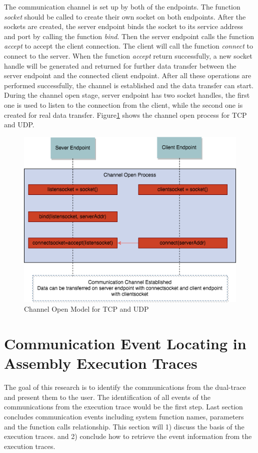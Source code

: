 The communication channel is set up by both of the endpoints. The function \textit{socket} should be called to create their own socket on both endpoints. After the sockets are created, the server endpoint binds the socket to its service address and port by calling the function \textit{bind}. Then the server endpoint calls the function  \textit{accept} to accept the client connection. The client will call the function \textit{connect} to connect to the server. When the function \textit{accept} return successfully, a new socket handle will be generated and returned for further data transfer between the server endpoint and  the connected client endpoint. After all these operations are performed successfully, the channel is established and the data transfer can start. During the channel open stage, server endpoint has two socket handles, the first one is used to listen to the connection from the client, while the second one is created for real data transfer. Figure\ref{channelopen2} shows the channel open process for TCP and UDP.
    
\begin{figure}[H]
\centerline{\includegraphics[scale=0.55]{Figures/tcpudpchannelopen}}
 \caption{Channel Open Model for TCP and UDP}
\label{channelopen2}    
\end{figure}


\section{Communication Event Locating in Assembly Execution Traces}
The goal of this research is to identify the communications from the dual-trace and present them to the user. The identification of all events of the communications from the execution trace would be the first step. Last section concludes communication events including system function names, parameters and the function calls relationship. This section will 1) discuss the basis of the execution traces. and 2) conclude how to retrieve the event information from the execution traces.

